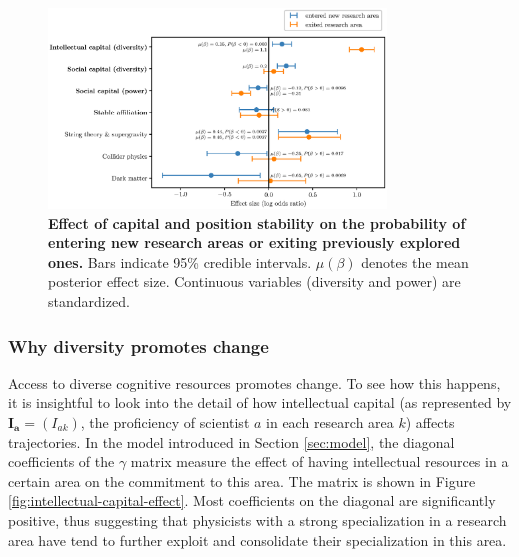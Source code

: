 \documentclass{article}
\begin{document}

\begin{figure}[h]
    \centering
    \includegraphics[width=0.8\textwidth]{plots/exited_score_effects_entropy_magnitude.eps}
    \caption{\textbf{Effect of capital and position stability on the probability of entering new research areas or exiting previously explored ones.} Bars indicate 95\% credible intervals. $\mu(\beta)$ denotes the mean posterior effect size. Continuous variables (diversity and power) are standardized.}
    \label{fig:diversification_score_effect}
\end{figure}


\subsubsection{Why diversity promotes change}

Access to diverse cognitive resources promotes change. To see how this happens, it is insightful to look into the detail of how intellectual capital (as represented by $\bm{I_a}=(I_{ak})$, the proficiency of scientist $a$ in each research area $k$) affects trajectories. In the model introduced in Section \ref{sec:model}, the diagonal coefficients of the $\gamma$ matrix measure the effect of having intellectual resources in a certain area on the commitment to this area. The matrix is shown in Figure \ref{fig:intellectual-capital-effect}. Most coefficients on the diagonal are significantly positive, thus suggesting that physicists with a strong specialization in a research area have tend to further exploit and consolidate their specialization in this area.
\end{document}
